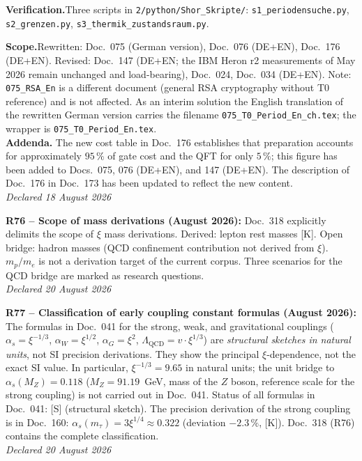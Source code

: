 \smallskip\noindent\textbf{Verification.}\quad Three scripts in
\texttt{2/python/Shor\_Skripte/}: \texttt{s1\_periodensuche.py},
\texttt{s2\_grenzen.py}, \texttt{s3\_thermik\_zustandsraum.py}.

\smallskip\noindent\textbf{Scope.}\quad Rewritten: Doc.~075 (German
version), Doc.~076 (DE+EN), Doc.~176 (DE+EN). Revised: Doc.~147 (DE+EN; the
IBM Heron r2 measurements of May 2026 remain unchanged and load-bearing),
Doc.~024, Doc.~034 (DE+EN). Note: \texttt{075\_RSA\_En} is a different
document (general RSA cryptography without T0 reference) and is not
affected. As an interim solution the English translation of the
rewritten German version carries the filename
\texttt{075\_T0\_Period\_En\_ch.tex}; the wrapper is
\texttt{075\_T0\_Period\_En.tex}.\\

\smallskip\noindent\textbf{Addenda.}\quad
The new cost table in Doc.~176 establishes that preparation accounts for
approximately $95\,\%$ of gate cost and the QFT for only $5\,\%$; this
figure has been added to Docs.~075, 076 (DE+EN), and 147 (DE+EN). The
description of Doc.~176 in Doc.~173 has been updated to reflect the new
content.\\
\emph{Declared 18 August 2026}

\medskip
\textbf{R76 -- Scope of mass derivations (August 2026):} Doc.~318 explicitly delimits the scope of $\xi$ mass derivations. Derived: lepton rest masses [K]. Open bridge: hadron masses (QCD confinement contribution not derived from $\xi$). $m_p/m_e$ is not a derivation target of the current corpus. Three scenarios for the QCD bridge are marked as research questions.\\
\emph{Declared 20 August 2026}

\medskip

\medskip
\textbf{R77 -- Classification of early coupling constant formulas (August 2026):} The formulas in Doc.~041 for the strong, weak, and gravitational couplings ($\alpha_s = \xi^{-1/3}$, $\alpha_W = \xi^{1/2}$, $\alpha_G = \xi^2$, $\Lambda_{\mathrm{QCD}} = v\cdot\xi^{1/3}$) are \emph{structural sketches in natural units}, not SI precision derivations. They show the principal $\xi$-dependence, not the exact SI value. In particular, $\xi^{-1/3} = 9.65$ in natural units; the unit bridge to $\alpha_s(M_Z) = 0.118$ ($M_Z = 91.19$~GeV, mass of the $Z$ boson, reference scale for the strong coupling) is not carried out in Doc.~041. Status of all formulas in Doc.~041: [S] (structural sketch). The precision derivation of the strong coupling is in Doc.~160: $\alpha_s(m_\tau) = 3\xi^{1/4} \approx 0.322$ (deviation $-2.3\,\%$, [K]). Doc.~318 (R76) contains the complete classification.\\
\emph{Declared 20 August 2026}

